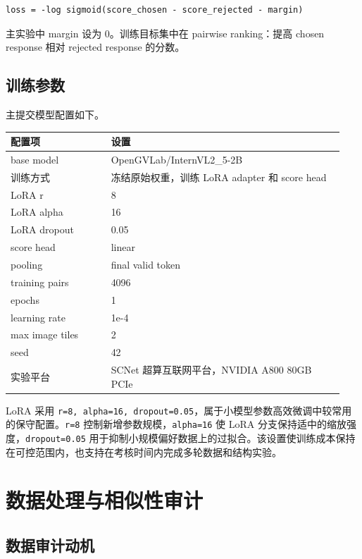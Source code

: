 \documentclass[11pt,a4paper]{ctexart}
\begin{document}
\begin{lstlisting}
loss = -log sigmoid(score_chosen - score_rejected - margin)
\end{lstlisting}

主实验中 margin 设为 0。训练目标集中在 pairwise ranking：提高 chosen response 相对 rejected response 的分数。

\subsection{训练参数}

主提交模型配置如下。

\begin{center}\small
\begin{longtable}{p{0.29\linewidth} p{0.65\linewidth}}
\toprule
配置项 & 设置 \\
\midrule
base model & OpenGVLab/InternVL2\_5-2B \\
训练方式 & 冻结原始权重，训练 LoRA adapter 和 score head \\
LoRA r & 8 \\
LoRA alpha & 16 \\
LoRA dropout & 0.05 \\
score head & linear \\
pooling & final valid token \\
training pairs & 4096 \\
epochs & 1 \\
learning rate & 1e-4 \\
max image tiles & 2 \\
seed & 42 \\
实验平台 & SCNet 超算互联网平台，NVIDIA A800 80GB PCIe \\
\bottomrule
\end{longtable}\end{center}

LoRA 采用 \texttt{r=8, alpha=16, dropout=0.05}，属于小模型参数高效微调中较常用的保守配置。\texttt{r=8} 控制新增参数规模，\texttt{alpha=16} 使 LoRA 分支保持适中的缩放强度，\texttt{dropout=0.05} 用于抑制小规模偏好数据上的过拟合。该设置使训练成本保持在可控范围内，也支持在考核时间内完成多轮数据和结构实验。

\section{数据处理与相似性审计}

\subsection{数据审计动机}
\end{document}
